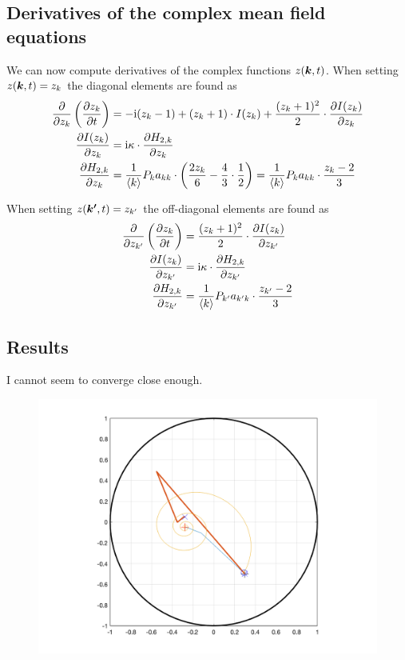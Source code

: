 \subsection{Derivatives of the complex mean field equations}
We can now compute derivatives of the complex functions $z({\boldsymbol{k}},t)$. When setting $z({\boldsymbol{k}}, t) = z_k$ the diagonal elements are found as
\begin{equation}
\begin{aligned}[b]
\frac{\partial}{\partial z_k}\left(\frac{\partial z_k}{\partial t} \right) &= - {\rm{i}}(z_k - 1) + (z_k + 1) \cdot I(z_k) +  \frac{(z_k+1)^{2}}{2} \cdot \frac{\partial I(z_k)}{\partial z_k} \\
\frac{\partial I(z_k)}{\partial z_k} &= {\rm{i}} \kappa \cdot \frac{\partial H_{2,k}}{\partial z_k} \\
\frac{\partial H_{2,k}}{\partial z_k} &= \frac{1}{{\langle k\rangle}} P_k a_{kk} \cdot \left(\frac{2 z_k}{6} - \frac{4}{3} \cdot \frac{1}{2} \right) = \frac{1}{{\langle k\rangle}} P_k a_{kk} \cdot\frac{z_{k} - 2}{3}
\end{aligned}
\label{eq:OttAntonsenSystemJacobianDiagonal}
\end{equation}

When setting $z({\boldsymbol{k'}}, t) = z_{k'}$ the off-diagonal elements are found as
\begin{equation}
\begin{aligned}[b]
\frac{\partial}{\partial z_{k'}}\left(\frac{\partial z_k}{\partial t} \right) &= \frac{(z_k + 1)^{2}}{2} \cdot \frac{\partial I(z_k)}{\partial z_{k'}} \\
\frac{\partial I(z_k)}{\partial z_{k'}} &= {\rm{i}} \kappa \cdot \frac{\partial H_{2,k}}{\partial z_{k'}} \\
\frac{\partial H_{2,k}}{\partial z_{k'}} &= \frac{1}{{\langle k\rangle}} P_{k'} a_{k'k} \cdot \frac{z_{k'} - 2}{3}
\end{aligned}
\label{eq:OttAntonsenSystemJacobianDiagonal}
\end{equation}


\subsection{Results}
I cannot seem to converge close enough.
\begin{figure}[H]
\centering
\includegraphics[width = \textwidth]{../Figures/ProblemsWithNewtonRaphson.png}
\end{figure}




\small{}

\label{LastPage}~


